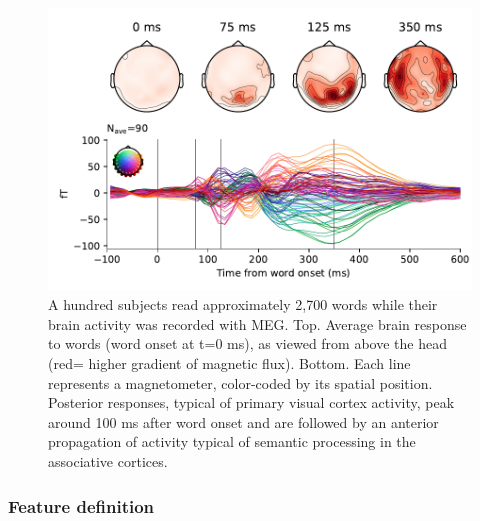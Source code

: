 \begin{figure}[t!]
  \begin{minipage}[c]{0.6\textwidth}
    \includegraphics[width=\textwidth, trim=0cm 0cm 0cm 0cm, clip=True]{figures/meg_evoked.pdf}
  \end{minipage}\hfill
  \begin{minipage}[c]{0.4\textwidth}
    \caption{A hundred subjects read approximately 2,700 words while their
    brain activity was recorded with MEG. Top. Average brain response to words
    (word onset at t=0 ms), as viewed from above the head (red= higher gradient
    of magnetic flux). Bottom. Each line represents a magnetometer, color-coded
    by its spatial position. Posterior responses, typical of primary visual
    cortex activity, peak around 100 ms after word onset and are followed by
    an anterior propagation of activity typical of semantic processing in the
    associative cortices.
    }
    \label{fig:meg_evoked}
  \end{minipage}
\end{figure}


\subsubsection{Feature definition}

